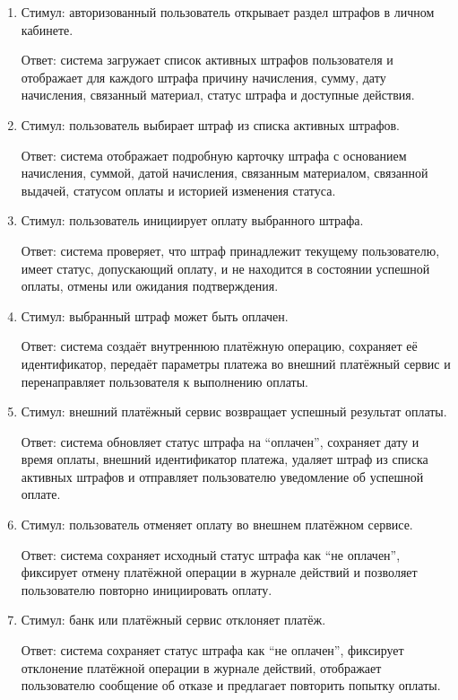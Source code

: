 \documentclass[12pt,a4paper]{article}
\begin{document}
	\begin{enumerate}
		\item Стимул: авторизованный пользователь открывает раздел штрафов в личном
		кабинете.
		
		Ответ: система загружает список активных штрафов пользователя и отображает
		для каждого штрафа причину начисления, сумму, дату начисления, связанный
		материал, статус штрафа и доступные действия.
		
		\item Стимул: пользователь выбирает штраф из списка активных штрафов.
		
		Ответ: система отображает подробную карточку штрафа с основанием начисления,
		суммой, датой начисления, связанным материалом, связанной выдачей, статусом
		оплаты и историей изменения статуса.
		
		\item Стимул: пользователь инициирует оплату выбранного штрафа.
		
		Ответ: система проверяет, что штраф принадлежит текущему пользователю,
		имеет статус, допускающий оплату, и не находится в состоянии успешной оплаты,
		отмены или ожидания подтверждения.
		
		\item Стимул: выбранный штраф может быть оплачен.
		
		Ответ: система создаёт внутреннюю платёжную операцию, сохраняет её
		идентификатор, передаёт параметры платежа во внешний платёжный сервис
		и перенаправляет пользователя к выполнению оплаты.
		
		\item Стимул: внешний платёжный сервис возвращает успешный результат оплаты.
		
		Ответ: система обновляет статус штрафа на ``оплачен'', сохраняет дату
		и время оплаты, внешний идентификатор платежа, удаляет штраф из списка
		активных штрафов и отправляет пользователю уведомление об успешной оплате.
		
		\item Стимул: пользователь отменяет оплату во внешнем платёжном сервисе.
		
		Ответ: система сохраняет исходный статус штрафа как ``не оплачен'',
		фиксирует отмену платёжной операции в журнале действий и позволяет
		пользователю повторно инициировать оплату.
		
		\item Стимул: банк или платёжный сервис отклоняет платёж.
		
		Ответ: система сохраняет статус штрафа как ``не оплачен'', фиксирует
		отклонение платёжной операции в журнале действий, отображает пользователю
		сообщение об отказе и предлагает повторить попытку оплаты.
		

\end{enumerate}
\end{document}
